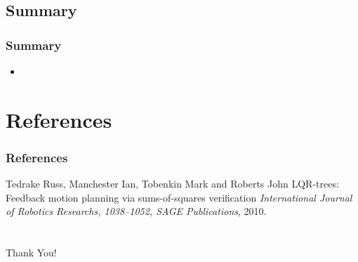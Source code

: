 \documentclass{beamer}
\begin{document}
\subsection{Summary}

\begin{frame}
\frametitle{Summary}

\begin{itemize}
\item 
\end{itemize}

\end{frame}

\section{References}

\begin{frame}
\frametitle{References}
\footnotesize{
\begin{thebibliography}{99} %


 Tedrake Russ, Manchester Ian, Tobenkin Mark and Roberts John
\newblock LQR-trees: Feedback motion planning via sums-of-squares verification
\newblock \emph{International Journal of Robotics Researchs, 1038--1052, SAGE Publications}, 2010.

\end{thebibliography}
}
\end{frame}

\section{}
\begin{frame}
\begin{center}
\Huge {Thank You!}
\end{center}
\end{frame}

\end{document}
